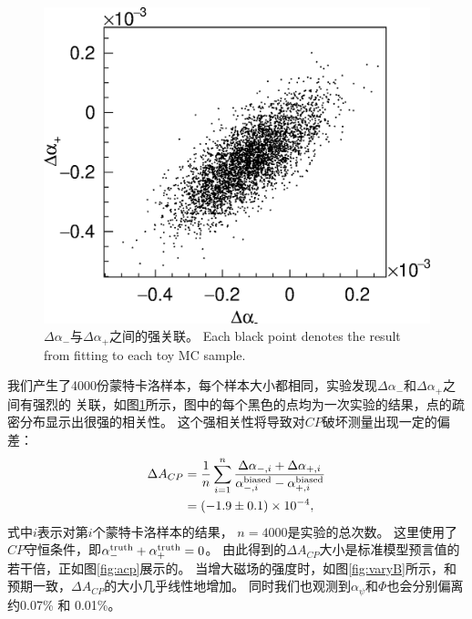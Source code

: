 \begin{figure}[h!]
    \centering
    \includegraphics[width=0.8\linewidth]{figures/spin/corr.eps}
    \caption{%
        $\Delta \alpha_{-}$与$\Delta \alpha_{+}$之间的强关联。
 Each black point denotes the result from fitting to each toy MC sample.}%
    \label{fig:corr}
\end{figure}
我们产生了4000份蒙特卡洛样本，每个样本大小都相同，实验发现$\Delta \alpha_{-}$和$\Delta \alpha_{+}$之间有强烈的
关联，如图\ref{fig:corr}所示，图中的每个黑色的点均为一次实验的结果，点的疏密分布显示出很强的相关性。
这个强相关性将导致对$CP$破坏测量出现一定的偏差：
\begin{equation}
    \begin{split}
       \Delta A_{CP} &= \frac{1}{n}  \sum_{i=1}^{n} 
         \frac{\Delta \alpha_{-, i} + \Delta \alpha_{+, i}}
         {\alpha_{-, i}^{\rm biased} - \alpha_{+, i}^{\rm biased}} \\
        &=  (-1.9 \pm 0.1) \times 10^{-4}, 
    \end{split}
\end{equation}
式中$i$表示对第$i$个蒙特卡洛样本的结果， $n=4000$是实验的总次数。
这里使用了$CP$守恒条件，即$\alpha_{-}^{\rm truth} + \alpha_{+}^{\rm truth} =0$。
由此得到的$\Delta A_{CP}$大小是标准模型预言值的若干倍，正如图\ref{fig:acp}展示的。 
当增大磁场的强度时，如图\ref{fig:varyB}所示，和预期一致，$\Delta A_{CP}$的大小几乎线性地增加。
同时我们也观测到$\alpha_{\psi}$和$\Phi$也会分别偏离约0.07\% 和 0.01\%。
